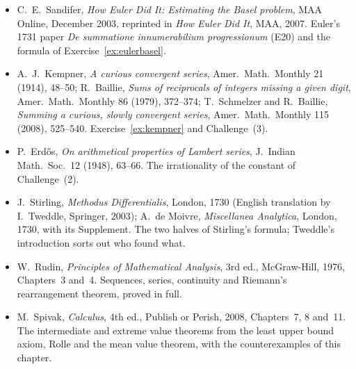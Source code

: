 \begin{itemize}
\item C.~E.~Sandifer, \emph{How Euler Did It: Estimating the Basel problem}, MAA Online, December 2003, reprinted in \emph{How Euler Did It}, MAA, 2007. Euler's 1731 paper \emph{De summatione innumerabilium progressionum} (E20) and the formula of Exercise~\ref{ex:eulerbasel}.
\item A.~J.~Kempner, \emph{A curious convergent series}, Amer.\ Math.\ Monthly 21 (1914), 48--50; R.~Baillie, \emph{Sums of reciprocals of integers missing a given digit}, Amer.\ Math.\ Monthly 86 (1979), 372--374; T.~Schmelzer and R.~Baillie, \emph{Summing a curious, slowly convergent series}, Amer.\ Math.\ Monthly 115 (2008), 525--540. Exercise~\ref{ex:kempner} and Challenge~(3).
\item P.~Erd\H{o}s, \emph{On arithmetical properties of Lambert series}, J.\ Indian Math.\ Soc.\ 12 (1948), 63--66. The irrationality of the constant of Challenge~(2).
\item J.~Stirling, \emph{Methodus Differentialis}, London, 1730 (English translation by I.~Tweddle, Springer, 2003); A.~de Moivre, \emph{Miscellanea Analytica}, London, 1730, with its Supplement. The two halves of Stirling's formula; Tweddle's introduction sorts out who found what.
\item W.~Rudin, \emph{Principles of Mathematical Analysis}, 3rd ed., McGraw-Hill, 1976, Chapters~3 and~4. Sequences, series, continuity and Riemann's rearrangement theorem, proved in full.
\item M.~Spivak, \emph{Calculus}, 4th ed., Publish or Perish, 2008, Chapters~7, 8 and~11. The intermediate and extreme value theorems from the least upper bound axiom, Rolle and the mean value theorem, with the counterexamples of this chapter.
\end{itemize}

